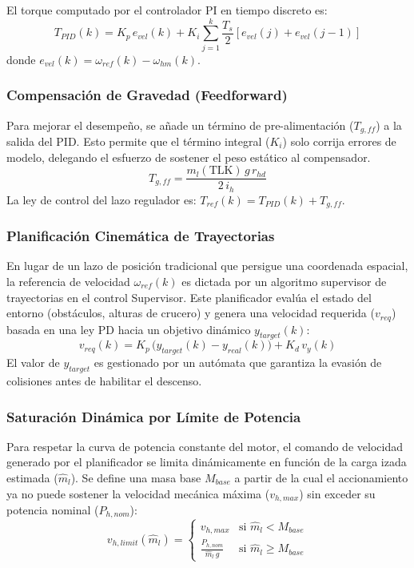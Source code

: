 \documentclass[11pt]{article}                                    %
\begin{document}
El torque computado por el controlador PI en tiempo discreto es:
\begin{equation}
    T_{PID}(k) = K_p \, e_{vel}(k) + K_i \sum_{j=1}^{k} \frac{T_s}{2} \left[ e_{vel}(j) + e_{vel}(j-1) \right]
\end{equation}
donde $e_{vel}(k) = \omega_{ref}(k) - \omega_{hm}(k)$.

\subsubsection{Compensación de Gravedad (Feedforward)}
Para mejorar el desempeño, se añade un término de pre-alimentación ($T_{g,ff}$) a la salida del PID. Esto permite que el término integral ($K_i$) solo corrija errores de modelo, delegando el esfuerzo de sostener el peso estático al compensador.
\begin{equation}
        T_{g,ff} = \frac{m_l(\text{TLK}) \, g \, r_{hd}}{2 \, i_h}
\end{equation}
La ley de control del lazo regulador es: 
$T_{ref}(k) = T_{PID}(k) + T_{g,ff}$.

\subsubsection{Planificación Cinemática de Trayectorias}
En lugar de un lazo de posición tradicional que persigue una coordenada espacial, la referencia de velocidad $\omega_{ref}(k)$ es dictada por un algoritmo supervisor de trayectorias en el control Supervisor. Este planificador evalúa el estado del entorno (obstáculos, alturas de crucero) y genera una velocidad requerida ($v_{req}$) basada en una ley PD hacia un objetivo dinámico $y_{target}(k)$:
\begin{equation}
    v_{req}(k) = K_{p} \, \bigl(y_{target}(k) - y_{real}(k)\bigr) + K_{d} \, v_{y}(k)
\end{equation}
El valor de $y_{target}$ es gestionado por un autómata que garantiza la evasión de colisiones antes de habilitar el descenso. 

\subsubsection{Saturación Dinámica por Límite de Potencia}
Para respetar la curva de potencia constante del motor, el comando de velocidad generado por el planificador se limita dinámicamente en función de la carga izada estimada ($\hat{m}_l$). Se define una masa base $M_{base}$ a partir de la cual el accionamiento ya no puede sostener la velocidad mecánica máxima ($v_{h,max}$) sin exceder su potencia nominal ($P_{h,nom}$):
\begin{equation}
    v_{h,limit}(\hat{m}_l) = 
    \begin{cases} 
        v_{h,max} & \text{si } \hat{m}_l < M_{base} \\
        \frac{P_{h,nom}}{\hat{m}_l \, g} & \text{si } \hat{m}_l \ge M_{base}
    \end{cases}
\end{equation}
\end{document}
